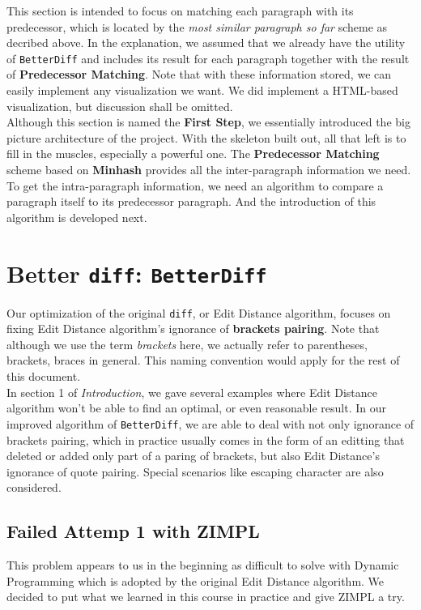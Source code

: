 \documentclass{article}
\begin{document}
This section is intended to focus on matching each paragraph with its predecessor, which is located by the \textit{most similar paragraph so far} scheme as decribed above. In the explanation, we assumed that we already have the utility of \texttt{BetterDiff} and includes its result for each paragraph together with the result of \textbf{Predecessor Matching}. Note that with these information stored, we can easily implement any visualization we want. We did implement a HTML-based visualization, but discussion shall be omitted. \\

Although this section is named the \textbf{First Step}, we essentially introduced the big picture architecture of the project. With the skeleton built out, all that left is to fill in the muscles, especially a powerful one. The \textbf{Predecessor Matching} scheme based on \textbf{Minhash} provides all the inter-paragraph information we need. To get the intra-paragraph information, we need an algorithm to compare a paragraph itself to its predecessor paragraph. And the introduction of this algorithm is developed next.

\section{Better \texttt{diff}: \texttt{BetterDiff}}
Our optimization of the original \texttt{diff}, or Edit Distance algorithm, focuses on fixing Edit Distance algorithm's ignorance of \textbf{brackets pairing}. Note that although we use the term \textit{brackets} here, we actually refer to parentheses, brackets, braces in general. This naming convention would apply for the rest of this document. \\

In section 1 of \textit{Introduction}, we gave several examples where Edit Distance algorithm won't be able to find an optimal, or even reasonable result. In our improved algorithm of \texttt{BetterDiff}, we are able to deal with not only ignorance of brackets pairing, which in practice usually comes in the form of an editting that deleted or added only part of a paring of brackets, but also Edit Distance's ignorance of quote pairing. Special scenarios like escaping character are also considered.

\subsection{Failed Attemp 1 with ZIMPL}
This problem appears to us in the beginning as difficult to solve with Dynamic Programming which is adopted by the original Edit Distance algorithm. We decided to put what we learned in this course in practice and give ZIMPL a try. \\
\end{document}
